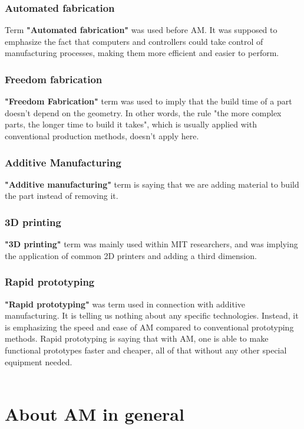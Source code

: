 \documentclass[a4paper, twoside, 11pt]{report}
\begin{document}
\subsection{Automated fabrication}
Term \textbf{"Automated fabrication"} was used before AM. It was supposed to emphasize the fact that computers and controllers could take control of manufacturing processes, making them more efficient and easier to perform.
\subsection{Freedom fabrication}
\textbf{"Freedom Fabrication"} term was used to imply that the build time of a part doesn't depend on the geometry. In other words, the rule "the more complex parts, the longer time to build it takes", which is usually applied with conventional production methods, doesn't apply here.
\subsection{Additive Manufacturing}
\textbf{"Additive manufacturing"} term is saying that we are adding material to build the part instead of removing it.
\subsection{3D printing}
\textbf{"3D printing"} term was mainly used within MIT researchers, and was implying the application of common 2D printers and adding a third dimension.
\subsection{Rapid prototyping}
\textbf{"Rapid prototyping"} was term used in connection with additive manufacturing. It is telling us nothing about any specific technologies. Instead, it is emphasizing the speed and ease of AM compared to conventional prototyping methods. Rapid prototyping is saying that with AM, one is able to make functional prototypes faster and cheaper, all of that without any other special equipment needed.\\
\\
\cite[p.~7]{AMT}
%
%
%
\chapter{About AM in general}
%
\end{document}
